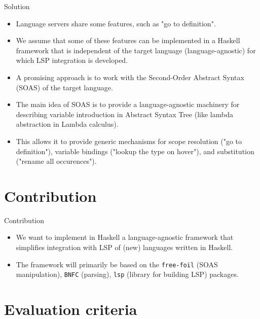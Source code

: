 \documentclass[serif, aspectratio=169]{beamer}
\begin{document}
\begin{frame}{Solution}
	\begin{itemize}
		[<+-| alert+>] %
		\item Language servers share some features, such as "go to definition".
		\item We assume that some of these features can be implemented in a Haskell framework that is independent of the target language (language-agnostic) for which LSP integration is developed.
		\item A promising approach is to work with the Second-Order Abstract Syntax (SOAS) \cite{fiore_formal_2022} of the target language.
		\item The main idea of SOAS is to provide a language-agnostic machinery for describing variable introduction in Abstract Syntax Tree (like lambda abstraction in Lambda calculus).
		\item This allows it to provide generic mechanisms for scope resolution ("go to definition"), variable bindings ("lookup the type on hover"), and substitution ("rename all occurences").
	\end{itemize}
\end{frame}

\section{Contribution}

\begin{frame}{Contribution}
	\begin{itemize}
		[<+-| alert+>] %
		\item We want to implement in Haskell a language-agnostic framework that simplifies integration with LSP of (new) languages written in Haskell.
		\item The framework will primarily be based on the \texttt{free-foil} \cite{hackage_free_foil} (SOAS manipulation), \texttt{BNFC} \cite{hackage_bnfc} (parsing), \texttt{lsp} \cite{hackage_lsp} (library for building LSP) packages.
	\end{itemize}
\end{frame}

\section{Evaluation criteria}
\label{sec:evaluation_criteria}
\end{document}

